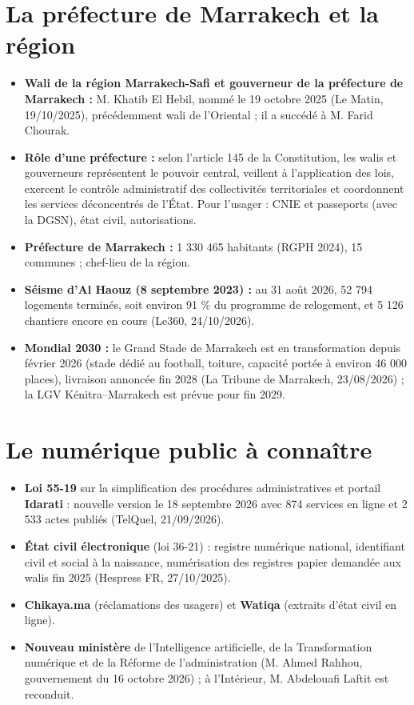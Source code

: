 \section{La préfecture de Marrakech et la région}
\begin{itemize}
    \item \textbf{Wali de la région Marrakech-Safi et gouverneur de la préfecture de Marrakech :} M. Khatib El Hebil, nommé le 19 octobre 2025 (Le Matin, 19/10/2025), précédemment wali de l'Oriental ; il a succédé à M. Farid Chourak.
    \item \textbf{Rôle d'une préfecture :} selon l'article 145 de la Constitution, les walis et gouverneurs représentent le pouvoir central, veillent à l'application des lois, exercent le contrôle administratif des collectivités territoriales et coordonnent les services déconcentrés de l'État. Pour l'usager : CNIE et passeports (avec la DGSN), état civil, autorisations.
    \item \textbf{Préfecture de Marrakech :} 1 330 465 habitants (RGPH 2024), 15 communes ; chef-lieu de la région.
    \item \textbf{Séisme d'Al Haouz (8 septembre 2023) :} au 31 août 2026, 52 794 logements terminés, soit environ 91 \% du programme de relogement, et 5 126 chantiers encore en cours (Le360, 24/10/2026).
    \item \textbf{Mondial 2030 :} le Grand Stade de Marrakech est en transformation depuis février 2026 (stade dédié au football, toiture, capacité portée à environ 46 000 places), livraison annoncée fin 2028 (La Tribune de Marrakech, 23/08/2026) ; la LGV Kénitra--Marrakech est prévue pour fin 2029.
\end{itemize}

\section{Le numérique public à connaître}
\begin{itemize}
    \item \textbf{Loi 55-19} sur la simplification des procédures administratives et portail \textbf{Idarati} : nouvelle version le 18 septembre 2026 avec 874 services en ligne et 2 533 actes publiés (TelQuel, 21/09/2026).
    \item \textbf{État civil électronique} (loi 36-21) : registre numérique national, identifiant civil et social à la naissance, numérisation des registres papier demandée aux walis fin 2025 (Hespress FR, 27/10/2025).
    \item \textbf{Chikaya.ma} (réclamations des usagers) et \textbf{Watiqa} (extraits d'état civil en ligne).
    \item \textbf{Nouveau ministère} de l'Intelligence artificielle, de la Transformation numérique et de la Réforme de l'administration (M. Ahmed Rahhou, gouvernement du 16 octobre 2026) ; à l'Intérieur, M. Abdelouafi Laftit est reconduit.
\end{itemize}

